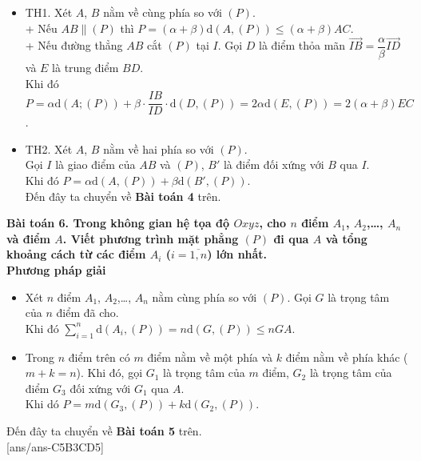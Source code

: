 \begin{itemize}
	\item TH1. Xét  $A$, $B$ nằm về cùng phía so với $(P)$.\\
	+ Nếu $AB\parallel (P)$ thì $P=\left(\alpha+\beta\right)\mathrm{d}(A,(P))\le \left(\alpha+\beta\right)AC$.\\
	+ Nếu đường thẳng $AB$ cắt $(P)$ tại $I$. Gọi $D$ là điểm thỏa mãn $\overrightarrow{IB}=\dfrac{\alpha}{\beta}\overrightarrow{ID}$ và $E$ là trung điểm $BD$.\\
	Khi đó $P=\alpha \mathrm{d}(A;(P))+\beta\cdot \dfrac{IB}{ID}\cdot \mathrm{d}(D,(P))=2\alpha \mathrm{d}(E,(P))=2\left(\alpha+\beta\right)EC$.
	\item TH2. Xét $A$, $B$ nằm về hai phía so với $(P)$.\\
	Gọi $I$ là giao điểm của $AB$ và $(P)$, $B'$ là điểm đối xứng với $B$ qua $I$.\\ 
	Khi đó $P=\alpha \mathrm{d}(A,(P))+\beta \mathrm{d}(B',(P))$.\\
	Đến đây ta chuyển về {\bf Bài toán 4} trên.
\end{itemize}
{\bf Bài toán 6. Trong không gian hệ tọa độ $Oxyz$, cho $n$ điểm $A_1$, $A_2$,\ldots, $A_n$ và điểm $A$. Viết phương trình mặt phẳng $(P)$ đi qua $A$ và tổng khoảng cách từ các điểm $A_i$ ($i=\overline{1,n}$) lớn nhất.}\\
{\bf Phương pháp giải}
\begin{itemize}
	\item Xét $n$ điểm $A_1$, $A_2$,\ldots, $A_n$ nằm cùng phía so với $(P)$. Gọi $G$ là trọng tâm của $n$ điểm đã cho.\\ 
	Khi đó $\sum\limits_{i=1}^{n}\mathrm{d}(A_i,(P))=n\mathrm{d}(G,(P))\le n GA$.
	\item Trong $n$ điểm trên có $m$ điểm nằm về một phía và $k$ điểm nằm về phía khác ($m+k=n$). Khi đó, gọi $G_1$ là trọng tâm của $m$ điểm, $G_2$ là trọng tâm của  điểm $G_3$ đối xứng với $G_1$ qua $A$.\\
	Khi dó $P=m \mathrm{d}(G_3,(P))+k\mathrm{d}(G_2,(P))$.
\end{itemize}
Đến đây ta chuyển về {\bf Bài toán 5} trên.\\
[ans/ans-C5B3CD5]
\TN
